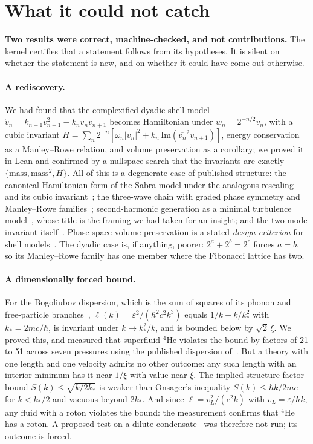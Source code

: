 \documentclass[11pt,a4paper]{article}
\theoremstyle{definition}
\newcommand{\conj}[1]{\overline{#1}}
\begin{document}
\section{What it could not catch}
\label{sec:limits}

\begin{retraction}
\textbf{Two results were correct, machine-checked, and not contributions.} The kernel
certifies that a statement follows from its hypotheses. It is silent on whether the
statement is new, and on whether it could have come out otherwise.
\end{retraction}

\paragraph{A rediscovery.} We had found that the complexified dyadic shell model
$\dot v_n = k_{n-1}v_{n-1}^2-k_n\conj{v_n}v_{n+1}$ becomes Hamiltonian under
$w_n=2^{-n/2}v_n$, with a cubic invariant
$H=\sum_n2^{-n}[\omega_n|v_n|^2+k_n\,\mathrm{Im}(\conj{v_n}^2v_{n+1})]$, energy conservation
as a Manley--Rowe relation, and volume preservation as a corollary; we proved it in Lean
and confirmed by a nullspace search that the invariants are exactly
$\{\text{mass},\text{mass}^2,H\}$. All of this is a degenerate case of published
structure: the canonical Hamiltonian form of the Sabra model under the analogous rescaling
and its cubic invariant~\cite{Lvov1999,Ditlevsen2000}; the three-wave chain with graded
phase symmetry and Manley--Rowe families~\cite{Vladimirova2021PRX}; second-harmonic
generation as a minimal turbulence model~\cite{Vladimirova2021PRE}, whose title is the
framing we had taken for an insight; and the two-mode invariant itself~\cite{ABDP1962}.
Phase-space volume preservation is a stated \emph{design criterion} for shell
models~\cite{Biferale2003}. The dyadic case is, if anything, poorer: $2^a+2^b=2^c$ forces
$a=b$, so its Manley--Rowe family has one member where the Fibonacci lattice has two.

\paragraph{A dimensionally forced bound.} For the Bogoliubov dispersion, which is the sum of
squares of its phonon and free-particle branches~\cite{Dalfovo1999},
$\ell(k)=\varepsilon^2/(\hbar^2c^2k^3)$ equals $1/k+k/k_*^2$ with $k_*=2mc/\hbar$, is
invariant under $k\mapsto k_*^2/k$, and is bounded below by $\sqrt2\,\xi$. We proved this,
and measured that superfluid $^4$He violates the bound by factors of 21 to 51 across seven
pressures using the published dispersion of~\cite{Godfrin2021}. But a theory with one length
and one velocity admits no other outcome: any such length with an interior minimum has it
near $1/\xi$ with value near $\xi$. The implied structure-factor bound
$S(k)\le\sqrt{k/2k_*}$ is weaker than Onsager's inequality $S(k)\le\hbar k/2mc$
\cite{Wreszinski2005,Stringari1993} for $k<k_*/2$ and vacuous beyond $2k_*$. And since
$\ell=v_L^2/(c^2k)$ with $v_L=\varepsilon/\hbar k$, any fluid with a roton violates the
bound: the measurement confirms that $^4$He has a roton. A proposed test on a dilute
condensate~\cite{Steinhauer2002} was therefore not run; its outcome is forced.
\end{document}
